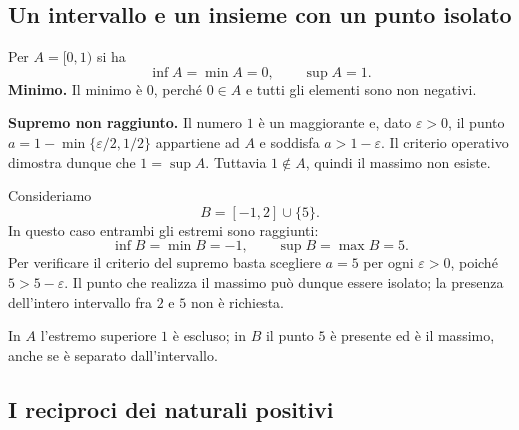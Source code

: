 \subsection{Un intervallo e un insieme con un punto isolato}

\begin{esempio}
Per $A=[0,1)$ si ha
\[
  \inf A=\min A=0,\qquad \sup A=1.
\]
\textbf{Minimo.} Il minimo è $0$, perché $0\in A$ e tutti gli elementi sono non negativi.

\textbf{Supremo non raggiunto.} Il numero $1$ è un maggiorante e, dato $\varepsilon>0$, il punto $a=1-\min\{\varepsilon/2,1/2\}$ appartiene ad $A$ e soddisfa $a>1-\varepsilon$. Il criterio operativo dimostra dunque che $1=\sup A$. Tuttavia $1\notin A$, quindi il massimo non esiste.
\end{esempio}

\begin{esempio}
Consideriamo
\[
  B=[-1,2]\cup\{5\}.
\]
In questo caso entrambi gli estremi sono raggiunti:
\[
  \inf B=\min B=-1,\qquad \sup B=\max B=5.
\]
Per verificare il criterio del supremo basta scegliere $a=5$ per ogni $\varepsilon>0$, poiché $5>5-\varepsilon$. Il punto che realizza il massimo può dunque essere isolato; la presenza dell'intero intervallo fra $2$ e $5$ non è richiesta.
\end{esempio}

\begin{schema}
\par\smallskip In $A$ l'estremo superiore $1$ è escluso; in $B$ il punto $5$ è presente ed è il massimo, anche se è separato dall'intervallo.
\end{schema}

\subsection{I reciproci dei naturali positivi}

